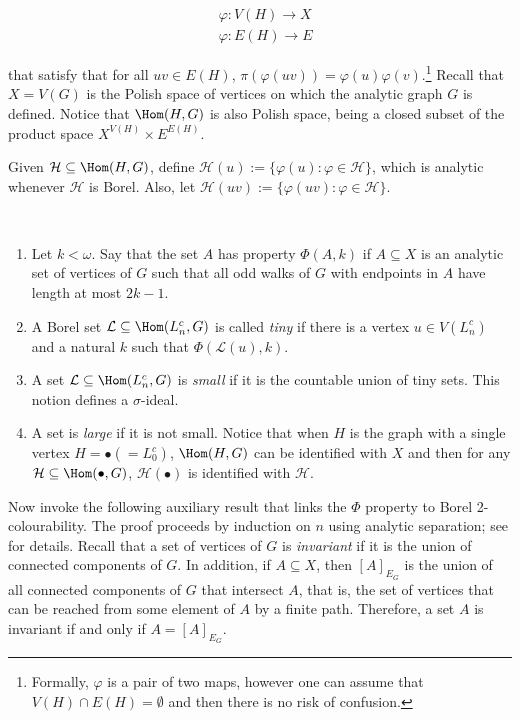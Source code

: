 \begin{align*}
    &\varphi\colon V(H)\to X\\
    &\varphi\colon E(H)\to E
\end{align*}

that satisfy that for all $uv\in E(H)$, $\pi(\varphi(uv))=\varphi(u)\varphi(v)$.\footnote{Formally, $\varphi$ is a pair of two maps, however one can assume that $V(H)\cap E(H)=\emptyset$ and then there is no risk of confusion.}
Recall that $X=V(G)$ is the Polish space of vertices on which the analytic graph $G$ is defined.
Notice that $\Hom(H,G)$ is also Polish space, being a closed subset of the product space $X^{V(H)}\times E^{E(H)}$.

Given $\mathcal H\subseteq\Hom(H,G)$, define $\mathcal H(u):=\{\varphi(u):\varphi\in\mathcal H\}$, which is analytic whenever $\mathcal H$ is Borel.
Also, let $\mathcal H(uv):=\{\varphi(uv):\varphi\in\mathcal H\}$.

\begin{definition}\label{def:small}~ 
\begin{enumerate}
    \item Let $k<\omega$.
    Say that the set $A$ has property $\Phi(A,k)$ if $A\subseteq X$ is an analytic set of vertices of $G$ such that all odd walks of $G$ with endpoints in $A$ have length at most $2k-1$.

    \item A Borel set $\mathcal L\subseteq\Hom(L^c_n,G)$ is called \emph{tiny} if there is a vertex $u\in V(L^c_n)$ and a natural $k$ such that $\Phi(\mathcal L(u),k)$.

    \item A set $\mathcal L\subseteq\Hom(L^c_n,G)$ is \emph{small} if it is the countable union of tiny sets.
    This notion defines a $\sigma$-ideal.

    \item A set is \emph{large} if it is not small.
    Notice that when $H$ is the graph with a single vertex $H=\bullet\left(=L^c_0\right)$, $\Hom(H,G)$ can be identified with $X$ and then for any $\mathcal H\subseteq\Hom(\bullet,G)$, $\mathcal H(\bullet)$ is identified with $\mathcal H$.
\end{enumerate}
\end{definition}

Now invoke the following auxiliary result that links the $\Phi$ property to Borel 2-colourability.
The proof proceeds by induction on $n$ using analytic separation; see \cite[Claims~3.3--3.5]{L0paper} for details.
Recall that a set of vertices of $G$ is \emph{invariant} if it is the union of connected components of $G$.
In addition, if $A\subseteq X$, then $[A]_{E_G}$ is the union of all connected components of $G$ that intersect $A$, that is, the set of vertices that can be reached from some element of $A$ by a finite path.
Therefore, a set $A$ is invariant if and only if $A=[A]_{E_G}$.


